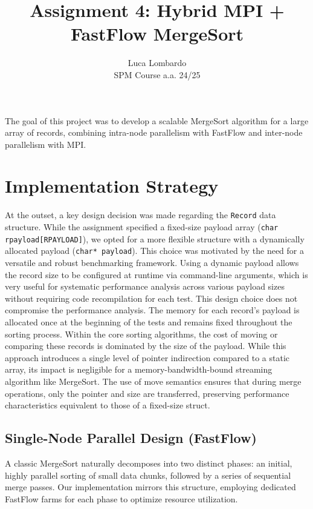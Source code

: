 \documentclass[10pt]{article}
\title{Assignment 4: Hybrid MPI + FastFlow MergeSort}
\author{Luca Lombardo \\ SPM Course a.a. 24/25}
\date{}
\newcommand{\code}[1]{\texttt{#1}}
\begin{document}
\maketitle
\vspace{-1.5em} %


The goal of this project was to develop a scalable MergeSort algorithm for a large array of records, combining intra-node parallelism with FastFlow and inter-node parallelism with MPI.
\section{Implementation Strategy}

At the outset, a key design decision was made regarding the \code{Record} data structure. While the assignment specified a fixed-size payload array (\code{char rpayload[RPAYLOAD]}), we opted for a more flexible structure with a dynamically allocated payload (\code{char* payload}). This choice was motivated by the need for a versatile and robust benchmarking framework. Using a dynamic payload allows the record size to be configured at runtime via command-line arguments, which is very useful for systematic performance analysis across various payload sizes without requiring code recompilation for each test. This design choice does not compromise the performance analysis. The memory for each record's payload is allocated once at the beginning of the tests and remains fixed throughout the sorting process. Within the core sorting algorithms, the cost of moving or comparing these records is dominated by the size of the payload. While this approach introduces a single level of pointer indirection compared to a static array, its impact is negligible for a memory-bandwidth-bound streaming algorithm like MergeSort. The use of move semantics ensures that during merge operations, only the pointer and size are transferred, preserving performance characteristics equivalent to those of a fixed-size struct.

\subsection{Single-Node Parallel Design (FastFlow)}
A classic MergeSort naturally decomposes into two distinct phases: an initial, highly parallel sorting of small data chunks, followed by a series of sequential merge passes. Our implementation mirrors this structure, employing dedicated FastFlow farms for each phase to optimize resource utilization.
\end{document}
